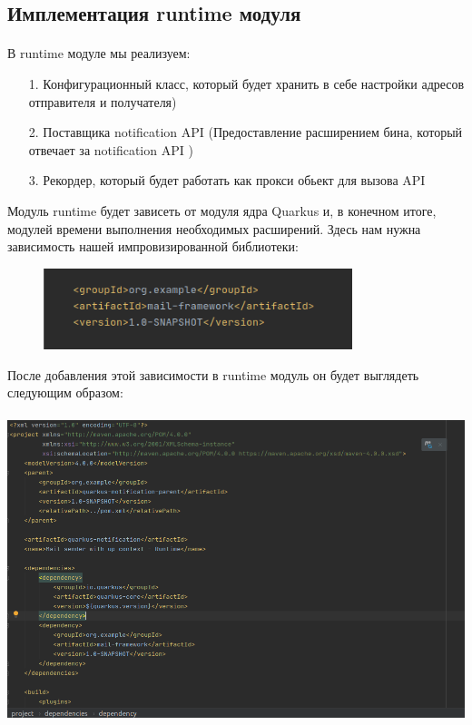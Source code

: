 \documentclass[russian,11pt]{article}
\begin{document}
\subsection{Имплементация runtime модуля}
\paragraph{ }
В runtime модуле мы реализуем:
 \begin{enumerate}
		\item[  1.] Конфигурационный класс, который будет хранить в себе настройки адресов отправителя и получателя)
		\item[  2.] Поставщика notification API (Предоставление расширением бина, который отвечает за notification API )
		\item[  3.] Рекордер, который будет работать как прокси обьект для вызова API
	\end{enumerate} 
	
	Модуль runtime будет зависеть от модуля ядра Quarkus и, в конечном итоге, модулей времени выполнения необходимых расширений. Здесь нам нужна зависимость нашей импровизированной библиотеки:

\begin{figure}[H]
	\centering
	\includegraphics[scale=1.5, width=9cm]{4}
\end{figure}


После добавления этой зависимости в runtime модуль он будет выглядеть следующим образом:

\paragraph{\includegraphics[scale=1.5, width=\textwidth]{5}}
\end{document}
